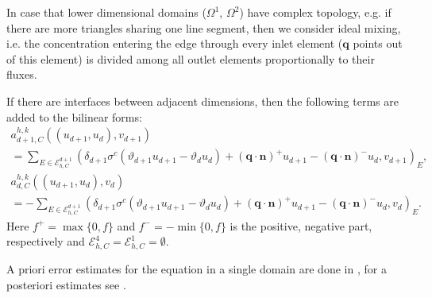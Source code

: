 \documentclass[a4paper]{article}
\def\Ehcom{\mathcal E_{h,C}}         %
\def\n{\vc n}
\def\vc#1{\mathbf{\boldsymbol{#1}}}     %
\def\sc#1#2{\left(#1,#2\right)}
\def\Th{\mathcal T_h}       %
\def\th{\vartheta}
\begin{document}
In case that lower dimensional domains ($\Omega^1$, $\Omega^2$) have complex topology, e.g. if there are more triangles sharing one line segment, then we consider ideal mixing, i.e. the concentration entering the edge through every inlet element ($\vc q$ points out of this element) is divided among all outlet elements proportionally to their fluxes.

If there are interfaces between adjacent dimensions, then the following terms are added to the bilinear forms:
\begin{multline*}
a^{h,k}_{d+1,C}((u_{d+1},u_d),v_{d+1})\\
= \sum_{E\in\Ehcom^{d+1}} \sc{\delta_{d+1}\sigma^c(\th_{d+1}u_{d+1}-\th_d u_d)+(\vc q\cdot\n)^+u_{d+1} - (\vc q\cdot\n)^-u_d}{v_{d+1}}_E,
\end{multline*}
\begin{multline*}
a^{h,k}_{d,C}((u_{d+1},u_d),v_d)\\
= -\sum_{E\in\Ehcom^{d+1}} \sc{\delta_{d+1}\sigma^c(\th_{d+1}u_{d+1}-\th_d u_d)+(\vc q\cdot\n)^+u_{d+1} - (\vc q\cdot\n)^-u_d}{v_d}_E.
\end{multline*}
Here $f^+=\max\{0,f\}$ and $f^-=-\min\{0,f\}$ is the positive, negative part, respectively and $\Ehcom^4=\Ehcom^1=\emptyset$.

A priori error estimates for the equation in a single domain are done in \cite{ern_stephansen_zunino}, for a posteriori estimates see \cite{ern2010guaranteed}.
\end{document}

